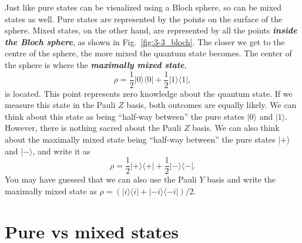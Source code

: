 Just like pure states can be visualized using a Bloch sphere, so can be mixed states as well.
Pure states are represented by the points on the surface of the sphere.
Mixed states, on the other hand, are represented by all the points \textit{\textbf{inside the Bloch sphere}}, as shown in Fig.~\ref{fig:3-3_bloch}.
The closer we get to the centre of the sphere, the more mixed the quantum state becomes.
The center of the sphere is where the \textit{\textbf{maximally mixed state}},
\begin{equation}
    \rho = \frac{1}{2} |0\rangle\langle0| + \frac{1}{2} |1\rangle\langle1|,
\end{equation}
is located.
This point represents zero knowledge about the quantum state.
If we measure this state in the Pauli $Z$ basis, both outcomes are equally likely.
We can think about this state as being ``half-way between'' the pure states $|0\rangle$ and $|1\rangle$.
However, there is nothing sacred about the Pauli $Z$ basis.
We can also think about the maximally mixed state being ``half-way between'' the pure states $|+\rangle$ and $|-\rangle$, and write it as
\begin{equation}
    \rho = \frac{1}{2} |+\rangle\langle+| + \frac{1}{2} |-\rangle\langle-|.
\end{equation}
You may have guessed that we can also use the Pauli $Y$ basis and write the maximally mixed state as $\rho = ( |i\rangle\langle i| + |-i\rangle\langle-i| ) / 2$.






\section{Pure vs mixed states}
\label{sec:3-4_pure_vs_mixed}

